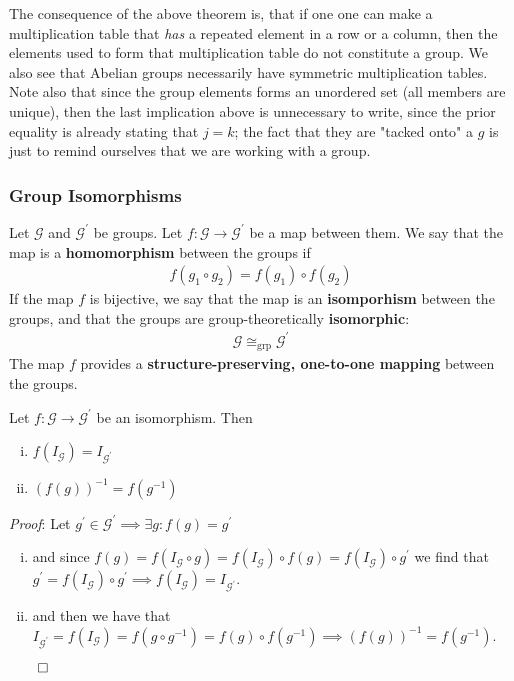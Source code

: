 \begin{remark}
    The consequence of the above theorem is, that if one one can make a multiplication table that \textit{has} a repeated element in a row or a column, then the elements used to form that multiplication table do not constitute a group. We also see that Abelian groups necessarily have symmetric multiplication tables. Note also that since the group elements forms an unordered set (all members are unique), then the last implication above is unnecessary to write, since the prior equality is already stating that \(j = k\); the fact that they are "tacked onto" a \(g\) is just to remind ourselves that we are working with a group.   
\end{remark}

\subsubsection{Group Isomorphisms}
\begin{definition}
    Let \(\mathcal{G} \) and \(\mathcal{G} ^{\prime} \) be groups. Let \(f : \mathcal{G} \to  \mathcal{G} ^{\prime} \) be a map between them. We say that the map is a \textbf{homomorphism} between the groups if \begin{align*}
        f(g_1 \circ g_2) = f(g_1) \circ f(g_2)
    \end{align*}
    If the map \(f\) is bijective, we say that the map is an \textbf{isomporhism} between the groups, and that the groups are group-theoretically \textbf{isomorphic}: \begin{align*}
        \mathcal{G} \cong_{\text{grp}} \mathcal{G}^{\prime}  
    \end{align*}   
    The map \(f\) provides a \textbf{structure-preserving, one-to-one mapping} between the groups. 
\end{definition}

\begin{proposition}
    Let \(f : \mathcal{G} \to \mathcal{G} ^{\prime} \) be an isomorphism. Then \begin{enumerate}[i)]
        \item \(f(I_{\mathcal{G} } ) = I_{\mathcal{G} ^{\prime} }\)
        \item \(\left( f(g) \right) ^{-1} = f(g^{-1}) \)  
    \end{enumerate} 
\end{proposition}
\textit{Proof}: Let \(g^{\prime} \in \mathcal{G}^{\prime} \implies \exists g : f(g) = g^{\prime}\)  
\begin{enumerate}[i)]
    \item and since \(f(g) = f(I_{\mathcal{G} } \circ g ) = f(I_{\mathcal{G} } ) \circ f(g) = f(I_{\mathcal{G} }) \circ g^{\prime}\) we find that \(g^{\prime} = f(I_{\mathcal{G}} ) \circ g^{\prime}\implies f(I_{\mathcal{G} }) = I_{\mathcal{G}^{\prime} } \).
    \item and then we have that \(I_{\mathcal{G} ^{\prime}} = f(I_{\mathcal{G} } ) = f(g \circ g^{-1}) = f(g) \circ f(g^{-1}) \implies \left( f(g) \right)^{-1} = f(g^{-1})\).
\end{enumerate}
\hfill\(\qed\) 

